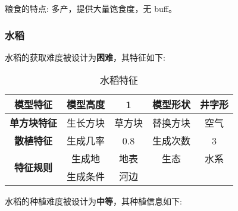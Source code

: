 粮食的特点: 多产，提供大量饱食度，无 buff。

\subsubsection{水稻}

水稻的获取难度被设计为\textbf{困难}，其特征如下:
\begin{table}[H]
    \centering
    \caption{水稻特征}
    \label{table:水稻特征}
    \setlength{\tabcolsep}{4mm}
    \begin{tabular}{c|cc|cc}
        \toprule
        \textbf{模型特征}                  & 模型高度 & 1      & 模型形状 & 井字形 \\
        \midrule
        \textbf{单方块特征}                & 生长方块 & 草方块 & 替换方块 & 空气   \\
        \midrule
        \textbf{散植特征}                  & 生成几率 & 0.8    & 生成次数 & 3      \\
        \midrule
        \multirow{2}{*}{\textbf{特征规则}} & 生成地   & 地表   & 生态     & 水系   \\
                                           & 生成条件 & 河边                       \\
        \bottomrule
    \end{tabular}
\end{table}


水稻的种植难度被设计为\textbf{中等}，其种植信息如下:

